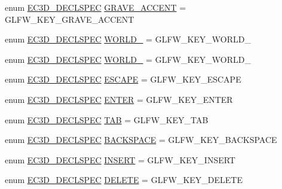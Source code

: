 \begin{DoxyCompactItemize}
\item 
enum \mbox{\hyperlink{_common_8h_aac42573e202ca3dd4d259c81691e2369}{E\+C3\+D\+\_\+\+D\+E\+C\+L\+S\+P\+EC}} \mbox{\hyperlink{classec_1_1_keyboard_ac68571beb478df0549b9f67a623fc84c}{G\+R\+A\+V\+E\+\_\+\+A\+C\+C\+E\+NT}} = G\+L\+F\+W\+\_\+\+K\+E\+Y\+\_\+\+G\+R\+A\+V\+E\+\_\+\+A\+C\+C\+E\+NT
\item 
enum \mbox{\hyperlink{_common_8h_aac42573e202ca3dd4d259c81691e2369}{E\+C3\+D\+\_\+\+D\+E\+C\+L\+S\+P\+EC}} \mbox{\hyperlink{classec_1_1_keyboard_a1eb7d04d0c734fb8fef4d8386fb7a4d0}{W\+O\+R\+L\+D\+\_}} = G\+L\+F\+W\+\_\+\+K\+E\+Y\+\_\+\+W\+O\+R\+L\+D\+\_
\item 
enum \mbox{\hyperlink{_common_8h_aac42573e202ca3dd4d259c81691e2369}{E\+C3\+D\+\_\+\+D\+E\+C\+L\+S\+P\+EC}} \mbox{\hyperlink{classec_1_1_keyboard_aab87be510c1ae98007e98afa30952918}{W\+O\+R\+L\+D\+\_}} = G\+L\+F\+W\+\_\+\+K\+E\+Y\+\_\+\+W\+O\+R\+L\+D\+\_
\item 
enum \mbox{\hyperlink{_common_8h_aac42573e202ca3dd4d259c81691e2369}{E\+C3\+D\+\_\+\+D\+E\+C\+L\+S\+P\+EC}} \mbox{\hyperlink{classec_1_1_keyboard_a1685dbfbb1c03114c8121162e333f9b0}{E\+S\+C\+A\+PE}} = G\+L\+F\+W\+\_\+\+K\+E\+Y\+\_\+\+E\+S\+C\+A\+PE
\item 
enum \mbox{\hyperlink{_common_8h_aac42573e202ca3dd4d259c81691e2369}{E\+C3\+D\+\_\+\+D\+E\+C\+L\+S\+P\+EC}} \mbox{\hyperlink{classec_1_1_keyboard_a783ad084b5fd7d45451126bac7205274}{E\+N\+T\+ER}} = G\+L\+F\+W\+\_\+\+K\+E\+Y\+\_\+\+E\+N\+T\+ER
\item 
enum \mbox{\hyperlink{_common_8h_aac42573e202ca3dd4d259c81691e2369}{E\+C3\+D\+\_\+\+D\+E\+C\+L\+S\+P\+EC}} \mbox{\hyperlink{classec_1_1_keyboard_aef71873ca11f1076aaad6ea11d3d8aea}{T\+AB}} = G\+L\+F\+W\+\_\+\+K\+E\+Y\+\_\+\+T\+AB
\item 
enum \mbox{\hyperlink{_common_8h_aac42573e202ca3dd4d259c81691e2369}{E\+C3\+D\+\_\+\+D\+E\+C\+L\+S\+P\+EC}} \mbox{\hyperlink{classec_1_1_keyboard_aa45ab0ecea7c72a9715b49f9450dcdcd}{B\+A\+C\+K\+S\+P\+A\+CE}} = G\+L\+F\+W\+\_\+\+K\+E\+Y\+\_\+\+B\+A\+C\+K\+S\+P\+A\+CE
\item 
enum \mbox{\hyperlink{_common_8h_aac42573e202ca3dd4d259c81691e2369}{E\+C3\+D\+\_\+\+D\+E\+C\+L\+S\+P\+EC}} \mbox{\hyperlink{classec_1_1_keyboard_a460f6fe7c1740e5d8ef4eaf0ed182cd2}{I\+N\+S\+E\+RT}} = G\+L\+F\+W\+\_\+\+K\+E\+Y\+\_\+\+I\+N\+S\+E\+RT
\item 
enum \mbox{\hyperlink{_common_8h_aac42573e202ca3dd4d259c81691e2369}{E\+C3\+D\+\_\+\+D\+E\+C\+L\+S\+P\+EC}} \mbox{\hyperlink{classec_1_1_keyboard_a634762447b8ddd50dc8c002f9db5b9ae}{D\+E\+L\+E\+TE}} = G\+L\+F\+W\+\_\+\+K\+E\+Y\+\_\+\+D\+E\+L\+E\+TE

\end{DoxyCompactItemize}
